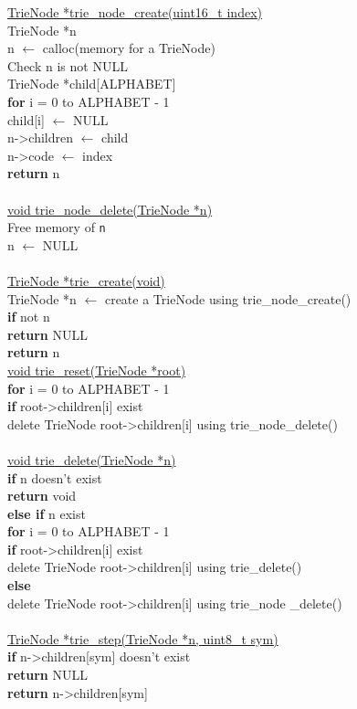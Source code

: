 \documentclass[12pt]{article}
\begin{document}
\underline{TrieNode *trie\_node\_create(uint16\_t index)} \\
\indent TrieNode *n \\
\indent n $\leftarrow$ calloc(memory for a TrieNode) \\
\indent Check n is not NULL \\
\indent TrieNode *child[ALPHABET] \\
\indent \textbf{for} i = 0 to ALPHABET - 1 \\
\indent \indent child[i] $\leftarrow$ NULL \\
\indent n->children $\leftarrow$ child \\
\indent n->code $\leftarrow$ index \\
\indent \textbf{return} n \\
\\
\underline{void trie\_node\_delete(TrieNode *n)} \\
\indent Free memory of \texttt{n} \\
\indent n $\leftarrow$ NULL \\
\\
\underline{TrieNode *trie\_create(void)} \\
\indent TrieNode *n $\leftarrow$ create a TrieNode using trie\_node\_create() \\
\indent \textbf{if} not n \\
\indent \indent \textbf{return} NULL \\
\indent \textbf{return} n
\\
\underline{void trie\_reset(TrieNode *root)} \\
\indent \textbf{for} i = 0 to ALPHABET - 1 \\
\indent \indent \textbf{if} root->children[i] exist \\
\indent \indent \indent delete TrieNode root->children[i] using trie\_node\_delete() \\
\\
\underline{void trie\_delete(TrieNode *n)} \\
\indent \textbf{if} n doesn't exist \\
\indent \indent \textbf{return} void \\
\indent \textbf{else if} n exist \\
\indent \indent \textbf{for} i = 0 to ALPHABET - 1 \\
\indent \indent \indent \textbf{if} root->children[i] exist \\
\indent \indent \indent \indent delete TrieNode root->children[i] using trie\_delete() \\
\indent \indent \indent \textbf{else} \\
\indent \indent \indent \indent delete TrieNode root->children[i] using trie\_node \_delete() \\
\\
\underline{TrieNode *trie\_step(TrieNode *n, uint8\_t sym)} \\
\indent \textbf{if} n->children[sym] doesn't exist \\
\indent \indent \textbf{return} NULL \\
\indent \textbf{return} n->children[sym] \\
\\
\end{document}
